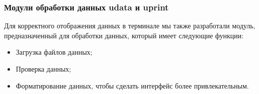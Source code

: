 \begin{frame}
\frametitle{Модули обработки данных udata и uprint}

Для корректного отображения данных в терминале мы также разработали модуль, предназначенный для обработки данных, который имеет следующие функции:

\begin{itemize}
    \item Загрузка файлов данных;
    \item Проверка данных;
    \item Форматирование данных, чтобы сделать интерфейс более привлекательным.
\end{itemize}

\end{frame}
